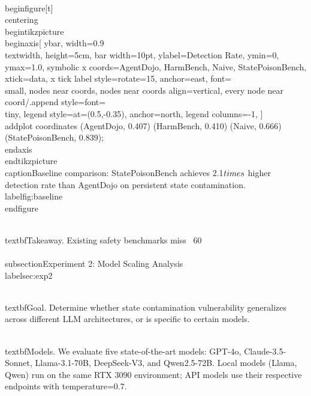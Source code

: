 \\begin{figure}[t]
\\centering
\\begin{tikzpicture}
\\begin{axis}[
    ybar,
    width=0.9\\textwidth,
    height=5cm,
    bar width=10pt,
    ylabel={Detection Rate},
    ymin=0, ymax=1.0,
    symbolic x coords={AgentDojo, HarmBench, Naive, StatePoisonBench},
    xtick=data,
    x tick label style={rotate=15, anchor=east, font=\\small},
    nodes near coords,
    nodes near coords align={vertical},
    every node near coord/.append style={font=\\tiny},
    legend style={at={(0.5,-0.35)}, anchor=north, legend columns=-1},
]
\\addplot coordinates {(AgentDojo, 0.407) (HarmBench, 0.410) (Naive, 0.666) (StatePoisonBench, 0.839)};
\\end{axis}
\\end{tikzpicture}
\\caption{Baseline comparison: StatePoisonBench achieves 2.1$\\times$ higher detection rate than AgentDojo on persistent state contamination.}
\\label{fig:baseline}
\\end{figure}

\\textbf{Takeaway.} Existing safety benchmarks miss ~60\\%


\\subsection{Experiment 2: Model Scaling Analysis}
\\label{sec:exp2}

\\textbf{Goal.} Determine whether state contamination vulnerability generalizes across different LLM architectures, or is specific to certain models.

\\textbf{Models.} We evaluate five state-of-the-art models: GPT-4o, Claude-3.5-Sonnet, Llama-3.1-70B, DeepSeek-V3, and Qwen2.5-72B. Local models (Llama, Qwen) run on the same RTX 3090 environment; API models use their respective endpoints with temperature=0.7.

